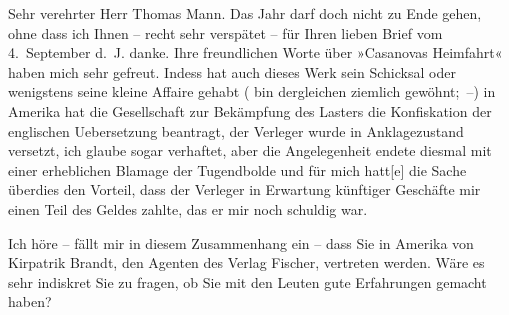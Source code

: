 \pstart{}Sehr verehrter Herr Thomas Mann. \pend\vspace{0.5em}
\pstart
           Das Jahr darf doch nicht zu Ende gehen, ohne dass ich Ihnen – recht sehr verspätet –
               für Ihren lieben Brief vom 4. September d. J. danke. Ihre freundlichen
               Worte über »Casanovas Heimfahrt« haben mich sehr
               gefreut. Indess hat auch dieses Werk sein Schicksal oder wenigstens seine kleine
               Affaire gehabt \introOben{}(\introOben{}\label{T_L02394-1v}\label{T_L02394-1} bin dergleichen
               ziemlich gewöhnt; –\introOben{})\introOben{} in Amerika hat die Gesellschaft zur Bekämpfung
                  des Lasters die Konfiskation der englischen Uebersetzung beantragt, der Verleger wurde in
               Anklagezustand versetzt, ich glaube sogar verhaftet, aber die Angelegenheit endete
               diesmal mit einer erheblichen Blamage der Tugendbolde und für mich
                  hatt{[}e{]} die Sache überdies den Vorteil, dass der Verleger in Erwartung
               künftiger Geschäfte mir einen Teil des Geldes zahlte, das er mir noch schuldig
               war.\pend
           
\pstart
           Ich höre – fällt mir in diesem Zusammenhang ein – dass Sie in Amerika von Kirpatrik {\kaufmannsund} Brandt, den Agenten des Verlag Fischer, vertreten werden. Wäre es sehr indiskret
               Sie zu fragen, ob Sie mit den Leuten gute Erfahrungen gemacht haben?\pend
           
